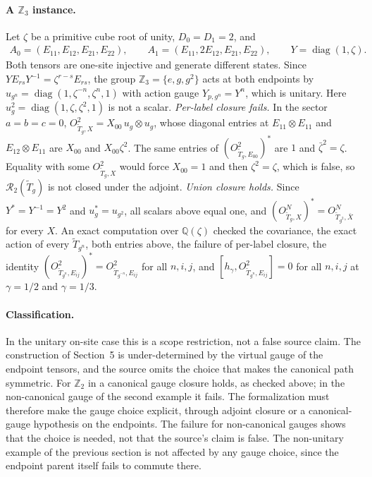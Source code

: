 \documentclass{article}
\begin{document}
\paragraph{A $\mathbb Z_3$ instance.} Let $\zeta$ be a primitive cube root
of unity, $D_0=D_1=2$, and
\begin{align}
    A_0=(E_{11},E_{12},E_{21},E_{22}),\qquad
    A_1=(E_{11},2E_{12},E_{21},E_{22}),\qquad
    Y=\operatorname{diag}(1,\zeta).
    \label{eq:glm23_parent_commutation_z3_tensors}
\end{align}
Both tensors are one-site injective and generate different states. Since
$YE_{rs}Y^{-1}=\zeta^{r-s}E_{rs}$, the group $\mathbb Z_3=\{e,g,g^2\}$
acts at both endpoints by
$u_{g^n}=\operatorname{diag}(1,\zeta^{-n},\zeta^n,1)$ with action gauge
$Y_{p,g^n}=Y^n$, which is unitary. Here
$u_g^2=\operatorname{diag}(1,\zeta,\zeta^2,1)$ is not a scalar.
\emph{Per-label closure fails.} In the sector $a=b=c=0$,
$O^2_{\widetilde T_g,X}=X_{00}\,u_g\otimes u_g$, whose diagonal entries at
$E_{11}\otimes E_{11}$ and $E_{12}\otimes E_{11}$ are $X_{00}$ and
$X_{00}\zeta^2$. The same entries of $(O^2_{\widetilde T_g,E_{00}})^*$ are
$1$ and $\bar\zeta^2=\zeta$. Equality with some $O^2_{\widetilde T_g,X}$
would force $X_{00}=1$ and then $\zeta^2=\zeta$, which is false, so
$\mathcal R_2(\widetilde T_g)$ is not closed under the adjoint.
\emph{Union closure holds.} Since $Y^*=Y^{-1}=Y^2$ and
$u_g^*=u_{g^2}$, all scalars above equal one, and
$(O^N_{\widetilde T_g,X})^*=O^N_{\widetilde T_{g^2},\bar X}$ for every $X$.
An exact computation over $\mathbb Q(\zeta)$ checked the covariance, the
exact action of every $\widetilde T_{g^n}$, both entries above, the
failure of per-label closure, the identity
$(O^2_{\widetilde T_{g^n},E_{ij}})^*=O^2_{\widetilde T_{g^{-n}},E_{ij}}$
for all $n,i,j$, and $[h_\gamma,O^2_{\widetilde T_{g^n},E_{ij}}]=0$ for all
$n,i,j$ at $\gamma=1/2$ and $\gamma=1/3$.

\paragraph{Classification.} In the unitary on-site case this is a scope
restriction, not a false source claim. The construction of Section~5 is
under-determined by the virtual gauge of the endpoint tensors, and the
source omits the choice that makes the canonical path symmetric. For
$\mathbb Z_2$ in a canonical gauge closure holds, as checked above; in the
non-canonical gauge of the second example it fails. The formalization
must therefore make the gauge choice explicit, through adjoint closure or
a canonical-gauge hypothesis on the endpoints. The failure for
non-canonical gauges shows that the choice is needed, not that the
source's claim is false. The non-unitary example of the previous section
is not affected by any gauge choice, since the endpoint parent itself
fails to commute there.
\end{document}
